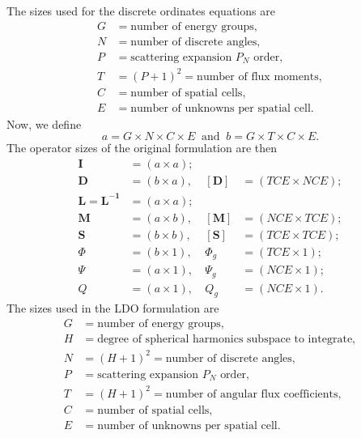 \documentclass{article} %
\newcommand{\ve}[1]{\ensuremath{\mathbf{#1}}}
\begin{document}
The sizes used for the discrete ordinates equations are
%
\begin{equation*}
  \begin{aligned}
    G &= \text{number of energy groups},\\
    N &= \text{number of discrete angles},\\
    P &= \text{scattering expansion $P_N$ order},\\
    T &= (P+1)^2 = \text{number of flux moments},\\
    C &= \text{number of spatial cells},\\
    E &= \text{number of unknowns per spatial cell}.
  \end{aligned}
\end{equation*}
%
Now, we define
%
\begin{equation}
  a = G \times N \times C \times E\ \text{ and }\
  b = G \times T \times C \times E.
\label{eq:dims}
\end{equation}
%
The operator sizes of the original formulation are then
%
\begin{align*}
\ve{I} &= (a \times a);  \\
\ve{D} &= (b \times a),\ &[\ve{D}] &= (TCE \times NCE); \\
\ve{L} = \ve{L^{-1}} &= (a \times a);  \\
\ve{M} &= (a \times b),\ &[\ve{M}] &= (NCE \times TCE); \\
\ve{S} &= (b \times b),\ &[\ve{S}] &= (TCE \times TCE); \\
\Phi &= (b \times 1),\   &\Phi_g   &= (TCE \times 1); \\
\Psi &= (a \times 1),\   &\Psi_g   &= (NCE \times 1); \\
Q &= (a \times 1),\      &Q_g      &= (NCE \times 1).
\end{align*}
%
The sizes used in the LDO formulation are
%
\begin{equation*}
  \begin{aligned}
    G &= \text{number of energy groups},\\
    H &= \text{degree of spherical harmonics subspace to integrate},\\
    N &= (H+1)^2 = \text{number of discrete angles},\\
    P &= \text{scattering expansion $P_N$ order},\\
    T &= (H+1)^2 = \text{number of angular flux coefficients},\\
    C &= \text{number of spatial cells},\\
    E &= \text{number of unknowns per spatial cell}.
  \end{aligned}
\end{equation*}
\end{document}
